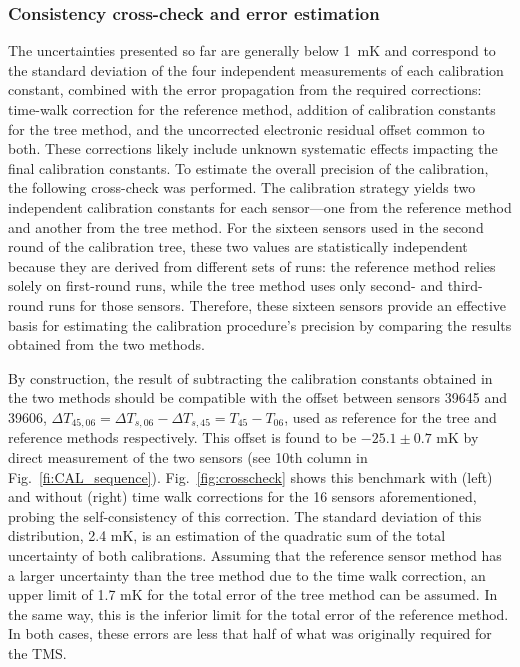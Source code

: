 \subsubsection{Consistency cross-check and error estimation} 
\label{sec:crossCheck}
\noindent The uncertainties presented so far are generally below 1~mK and correspond to the standard deviation of the four independent measurements of each calibration constant, combined with the error propagation from the required corrections: time-walk correction for the reference method, addition of calibration constants for the tree method, and the uncorrected electronic residual offset common to both. These corrections likely include unknown systematic effects impacting the final calibration constants. To estimate the overall precision of the calibration, the following cross-check was performed. The calibration strategy yields two independent calibration constants for each sensor---one from the reference method and another from the tree method. For the sixteen sensors used in the second round of the calibration tree, these two values are statistically independent because they are derived from different sets of runs: the reference method relies solely on first-round runs, while the tree method uses only second- and third-round runs for those sensors. Therefore, these sixteen sensors provide an effective basis for estimating the calibration procedure’s precision by comparing the results obtained from the two methods.

By construction, the result of subtracting the calibration constants obtained in the two methods should be compatible with the offset between sensors 39645 and 39606, $\Delta T_{45,06} = \Delta T_{s,06}-\Delta T_{s,45} = T_{45}-T_{06}$, used as reference for the tree and reference methods respectively. This offset is found to be $-25.1 \pm 0.7$ mK by direct measurement of the two sensors (see 10th column in Fig.~\ref{fi:CAL_sequence}).  Fig.~\ref{fig:crosscheck} shows this benchmark with (left) and without (right) time walk corrections for the 16 sensors aforementioned, probing the self-consistency of this correction. The standard deviation of this distribution, 2.4 mK, is an estimation of the quadratic sum of the total uncertainty of both calibrations. Assuming that the reference sensor method has a larger uncertainty than the tree method due to the time walk correction, an upper limit of 1.7 mK for the total error of the tree method can be assumed. In the same way, this is the inferior limit for the total error of the reference method. In both cases, these errors are less that half of what was originally required for the TMS.

